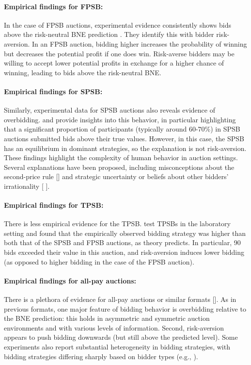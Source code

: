 \documentclass{article} %
\begin{document}
\paragraph{Empirical findings for FPSB:} In the case of FPSB auctions, experimental evidence consistently
shows bids above the risk-neutral BNE prediction \cite{cox1988theory}. They identify this with bidder
risk-aversion. In an FPSB auction, bidding higher increases the probability of winning but decreases
the potential profit if one does win. Risk-averse bidders may be willing to accept lower potential
profits in exchange for a higher chance of winning, leading to bids above the risk-neutral BNE.
\paragraph{Empirical findings for SPSB:} Similarly, experimental data for SPSB auctions also reveals
evidence of overbidding.  \cite{kagel1987information} and \cite{kagel1993independent} provide insights into this
behavior, in particular highlighting that a significant proportion of participants (typically around
60-70\%) in SPSB auctions submitted bids above their true values. However, in this case, the SPSB
has an equilibrium in dominant strategies, so the explanation is not risk-aversion. These findings
highlight the complexity of human behavior in auction settings. Several explanations have been
proposed, including misconceptions about the second-price rule [\cite{kagel1987information}] and strategic
uncertainty or beliefs about other bidders’ irrationality [\cite{crawford2007level}
].
\paragraph{Empirical findings for TPSB:} There is less empirical evidence for the TPSB. \cite{kagel1987information} test TPSBs in the laboratory setting and found that the empirically observed bidding strategy
was higher than both that of the SPSB and FPSB auctions, as theory predicts. In particular, 90%
bids exceeded their value in this auction, and risk-aversion induces lower bidding (as opposed to
higher bidding in the case of the FPSB auction).
\paragraph{Empirical findings for all-pay auctions:} There is a plethora of evidence for all-pay auctions
or similar formats [\cite{dechenaux2015survey}]. As in previous formats, one major feature of bidding
behavior is overbidding relative to the BNE prediction: this holds in asymmetric and symmetric
auction environments and with various levels of information. Second, risk-aversion appears to push
bidding downwards (but still above the predicted level). Some experiments also report substantial
heterogeneity in bidding strategies, with bidding strategies differing sharply based on bidder types
(e.g., \cite{gneezy2006all}).
\end{document}
